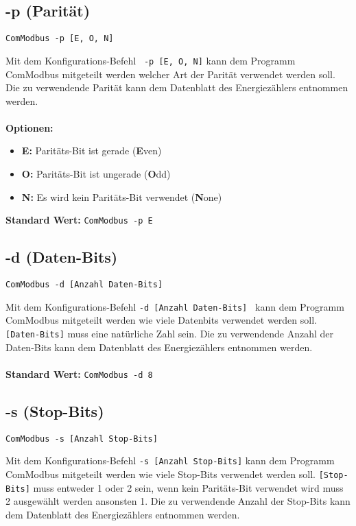 \documentclass[Bachelorarbeit.tex]{subfiles}
\begin{document}
\subsection*{-p (Parität)}
\begin{verbatim}
ComModbus -p [E, O, N]
\end{verbatim}
Mit dem Konfigurations-Befehl \texttt{ -p [E, O, N]} kann dem Programm ComModbus mitgeteilt werden welcher Art der Parität verwendet werden soll. Die zu verwendende Parität kann dem Datenblatt des Energiezählers entnommen werden.\\
\\
\textbf{Optionen:}
\begin{itemize}
\itemsep0em
\item \textbf{E:} \tab Paritäts-Bit ist gerade (\textbf{E}ven)
\item \textbf{O:} \tab Paritäts-Bit ist ungerade (\textbf{O}dd)
\item \textbf{N:} \tab Es wird kein Paritäts-Bit verwendet (\textbf{N}one)
\end{itemize}

\textbf{Standard Wert:} \tab \texttt{ComModbus -p E}

\subsection*{-d (Daten-Bits)}
\begin{verbatim}
ComModbus -d [Anzahl Daten-Bits]
\end{verbatim}
Mit dem Konfigurations-Befehl \texttt{-d [Anzahl Daten-Bits] } kann dem Programm ComModbus mitgeteilt werden wie viele Datenbits verwendet werden soll. \texttt{[Daten-Bits]} muss eine natürliche Zahl sein. Die zu verwendende Anzahl der Daten-Bits kann dem Datenblatt des Energiezählers entnommen werden.\\
\\
\textbf{Standard Wert:} \tab \texttt{ComModbus -d 8}

\subsection*{-s (Stop-Bits)}
\begin{verbatim}
ComModbus -s [Anzahl Stop-Bits]
\end{verbatim}
Mit dem Konfigurations-Befehl \texttt{-s [Anzahl Stop-Bits]} kann dem Programm ComModbus mitgeteilt werden wie viele Stop-Bits verwendet werden soll. \texttt{[Stop-Bits]} muss entweder 1 oder 2 sein, wenn kein Paritäts-Bit verwendet wird muss 2 ausgewählt werden ansonsten 1. Die zu verwendende Anzahl der Stop-Bits kann dem Datenblatt des Energiezählers entnommen werden.
\end{document}
